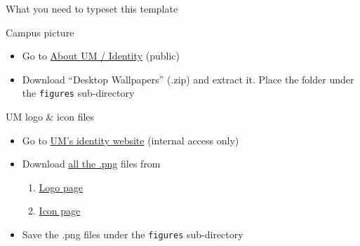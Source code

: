 \documentclass[12pt]{beamer}
\begin{document}
\begin{frame}{{\color{UMYellow} What you need} to typeset this template}

\begin{exampleblock}{Campus picture}
\begin{itemize}
\item Go to \href{https://www.um.edu.mo/about-um/identity/}{\myURL About UM / Identity} (public)
\item Download ``Desktop Wallpapers'' (.zip) and extract it. Place the folder under the {\tt \footnotesize figures} sub-directory 
\end{itemize}
\end{exampleblock}

\begin{exampleblock}{UM logo \& icon files}
\begin{itemize}
\item Go to \href{https://identity.co.um.edu.mo/}{\myURL UM's identity website} (internal access only)
\item Download \underline{all the .png} files from
	\begin{enumerate}
	\item \href{https://identity.co.um.edu.mo/university-logo/}{\myURL Logo page}
	\item \href{https://identity.co.um.edu.mo/university-icon/}{\myURL Icon page}
	\end{enumerate}
\item Save the .png files under the {\tt \footnotesize figures} sub-directory 
\end{itemize}
\end{exampleblock}

\end{frame}



{
\begin{frame}

 \color{UMYellow}{\bf\Large UMBlue as background color}

\end{frame}
}
\end{document}
